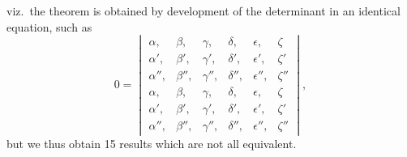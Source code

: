 \documentclass[11pt,a4paper]{article}
\begin{document}
\newpage


\noindent viz.\ the theorem is obtained by development of the determinant in an identical equation, such as
\[
0 = \begin{vmatrix}
\alpha, & \beta, & \gamma, & \delta, & \epsilon, & \zeta\\
\alpha', & \beta', & \gamma', & \delta', & \epsilon', & \zeta'\\
\alpha'', & \beta'', & \gamma'', & \delta'', & \epsilon'', & \zeta''\\
\alpha, & \beta, & \gamma, & \delta, & \epsilon, & \zeta\\
\alpha', & \beta', & \gamma', & \delta', & \epsilon', & \zeta'\\
\alpha'', & \beta'', & \gamma'', & \delta'', & \epsilon'', & \zeta''
\end{vmatrix},
\]
but we thus obtain 15 results which are not all equivalent.

\medskip
\end{document}

